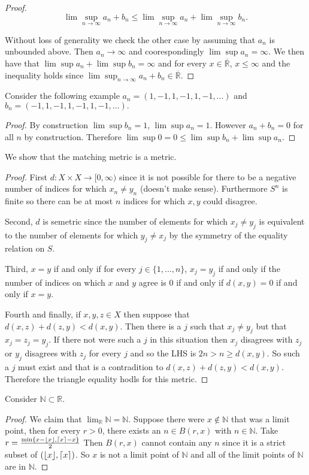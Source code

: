 \documentclass[letter]{article}
\DeclarePairedDelimiter\ceil{\lceil}{\rceil}
\DeclarePairedDelimiter\floor{\lfloor}{\rfloor}
\newenvironment{menumerate}{%
  \edef\backupindent{\the\parindent}%
  \enumerate%
  \setlength{\parindent}{\backupindent}%
}{\endenumerate}
\begin{document}
\begin{menumerate}
\begin{proof}
	 	$$ \lim \sup_{n\to\infty} a_n + b_n \leq \lim \sup_{n\to\infty} a_n + \lim \sup_{n\to\infty} b_n.$$

		Without loss of generality we check the other case by assuming that $a_n$ is unbounded above. Then $a_n \to \infty$ and coorespondingly $\lim \sup a_n = \infty.$ We then have that  $\lim \sup a_n + \lim \sup b_n = \infty$ and for every $x \in \overline{\mathbb{R}}$, $x \leq \infty$ and the inequality holds since $\lim \sup_{n\to\infty} a_n + b_n \in \overline{\mathbb{R}}.$
	\end{proof}
	 Consider the following example $a_n = (1,-1,1,-1,1,-1,...)$ and $b_n = (-1,1,-1,1,-1,1,-1, ...).$
	\begin{proof}
	 	By construction $\lim \sup b_n = 1$, $\lim \sup a_n = 1$.
	 	However $a_n + b_n = 0$ for all $n$ by construction. 
	 	Therefore $\lim \sup 0 = 0 \leq \lim \sup b_n + \lim \sup a_n$. 
	 	
	 \end{proof}  

	 \item We show that the matching metric is a metric.
	 \begin{proof}
	  	First $d: X \times X \to [0, \infty)$ since it is not possible for there to be a negative number of indices for which $x_n \neq y_n$ (doesn't make sense). Furthermore $S^n$ is finite so there can be at most $n$ indices for which $x,y$ could disagree.

	  	Second, $d$ is semetric since the number of elements for which $x_j \neq y_j$ is equivalent to the number of elements for which $y_j \neq x_j$ by the symmetry of the equality relation on $S$.

	  	Third, $x = y$ if and only if for every $j \in \{1, ..., n\}$, $x_j = y_j$ if and only if the number of indices on which $x$ and $y$ agree is $0$ if and only if $d(x,y) = 0$ if and only if $x = y$.

	  	Fourth and finally, if $x,y,z \in X$ then suppose that $d(x,z) + d(z,y) < d(x,y)$. Then there is a $j$ such that $x_j \neq y_j$ but that $x_j = z_j = y_j$. If there not were such a $j$ in this situation then $x_j$ disagrees with $z_j$ or $y_j$ disagrees with $z_j$ for every $j$ and so the LHS is $2n > n \geq d(x,y).$ So such a $j$ must exist and that is a contradition to $d(x,z) + d(z,y) < d(x,y).$ Therefore the triangle equality hodls for this metric.  
	  \end{proof} 

	  \item Consider $\mathbb{N} \subset \mathbb{R}$.
	   \begin{proof}
	   We claim that $\lim_\mathbb{R} \mathbb{N} = \mathbb{N}.$ Suppose there were $x \notin \mathbb{N}$ that was a limit point, then for every $r > 0$, there exists an $n \in B(r,x)$ with $n \in \mathbb{N}$. Take $r = \frac{\min\{x-\floor{x}, \ceil{x} - x\}}{2}$ Then $B(r,x)$ cannot contain any $n$
	   since it is a strict subset of $(\floor{x}, \ceil{x})$. So $x$ is not a limit point of $\mathbb{N}$ and all of the limit points of $\mathbb{N}$ are in $\mathbb{N}$. 


\end{proof}
\end{menumerate}
\end{document}
